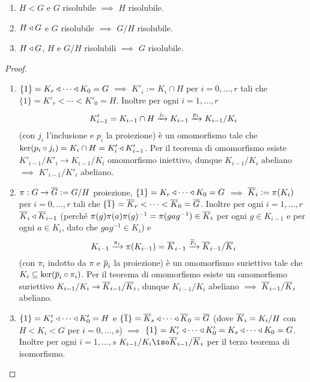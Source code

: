 \begin{prop}
\begin{enumerate}
\item $H<G$ e $G$ risolubile $\implies$ $H$ risolubile.
\item $H \triangleleft G$ e $G$ risolubile $\implies$ $G/H$ risolubile.
\item $H \triangleleft G$, $H$ e $G/H$ risolubili $\implies$ $G$ risolubile.
\end{enumerate}
\end{prop}
\begin{proof}
\begin{enumerate}
\item $\{1\}=K_r \triangleleft\cdots \triangleleft K_0=G$ $\implies$ $K'_i:=K_i\cap H$ per $i=0,\dots,r$ tali che $\{1\}=K'_r<\cdots<K'_0=H$. Inoltre per ogni $i=1,\dots,r$
\[
K'_{i-1}=K_{i-1}\cap H\xrightarrow{j_i}K_{i-1}\xrightarrow{p_i}K_{i-1}/K_i
\]
(con $j_i$ l'inclusione e $p_i$ la proiezione) è un omomorfismo tale che $\ker(p_i\circ j_i)=K_i\cap H=K'_i \triangleleft K'_{i-1}$. Per il teorema di omomorfismo esiste $K'_{i-1}/K'_i\to K_{i-1}/K_i$ omomorfismo iniettivo, dunque $K_{i-1}/K_i$ abeliano $\implies$ $K'_{i-1}/K'_i$ abeliano.
\item $\pi : G\to\overline{G}:=G/H$ proiezione, $\{1\}=K_r \triangleleft\cdots \triangleleft K_0=G$ $\implies$ $\overline{K}_i:=\pi(K_i)$ per $i=0,\dots,r$ tali che $\{\overline{1}\}=\overline{K}_r<\cdots<\overline{K}_0=\overline{G}$. Inoltre per ogni $i=1,\dots,r$ $\overline{K}_i \triangleleft\overline{K}_{i-1}$ (perché $\pi(g)\pi(a)\pi(g)^{-1}=\pi(gag^{-1})\in\overline{K}_i$ per ogni $g\in K_{i-1}$ e per ogni $a\in K_i$, dato che $gag^{-1}\in K_i$) e
\[
K_{i-1}\xrightarrow{\pi_i}\pi(K_{i-1})=\overline{K}_{i-1}\xrightarrow{\overline{p}_i}\overline{K}_{i-1}/\overline{K}_i
\]
(con $\pi_i$ indotto da $\pi$ e $\overline{p}_i$ la proiezione) è un omomorfismo suriettivo tale che $K_i\subseteq\ker(\overline{p}_i\circ\pi_i)$. Per il teorema di omomorfismo esiste un omomorfismo suriettivo $K_{i-1}/K_i\to\overline{K}_{i-1}/\overline{K}_i$, dunque $K_{i-1}/K_i$ abeliano $\implies$ $\overline{K}_{i-1}/\overline{K}_i$ abeliano.
\item $\{1\}=K'_r \triangleleft\cdots \triangleleft K'_0=H$ e $\{\overline{1}\}=\overline{K}_s \triangleleft\cdots \triangleleft\overline{K}_0=\overline{G}$ (dove $\overline{K}_i=K_i/H$ con $H<K_i<G$ per $i=0,\dots,s$) $\implies$ $\{1\}=K'_r \triangleleft\cdots \triangleleft K'_0=K_s \triangleleft\cdots \triangleleft K_0=G$. Inoltre per ogni $i=1,\dots,s$ $K_{i-1}/K_i\iso\cl{K}_{i-1}/\cl{K}_i$ per il terzo teorema di isomorfismo. \qedhere
\end{enumerate}
\end{proof}

